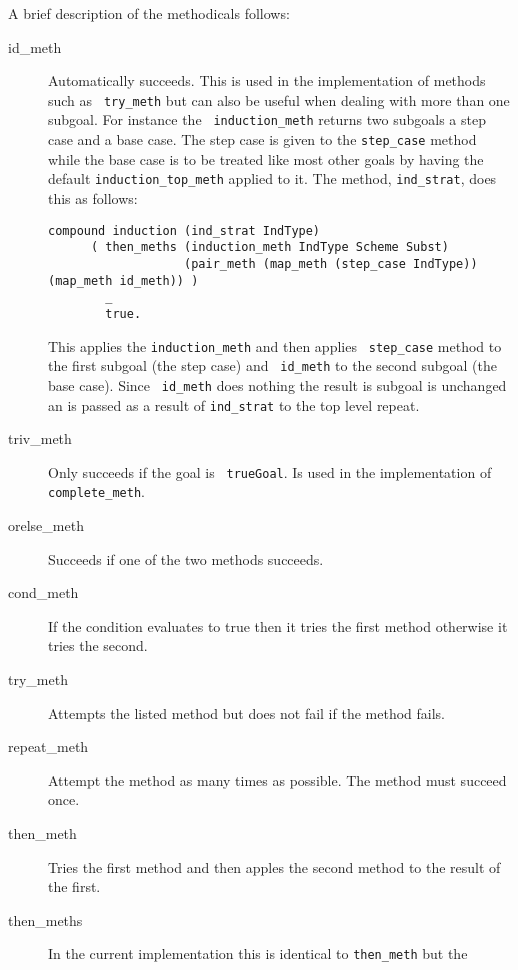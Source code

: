 A brief description of the methodicals follows:
\begin{description}
\item[id\_meth] Automatically succeeds.  This is used
  in the implementation of methods such as {\tt
    try\_meth} but can also be useful when dealing
  with more than one subgoal.  For instance the {\tt
    induction\_meth} returns two subgoals a
  step case and a base case.  The
  step case is given to the {\tt step\_case} method
  while the base case is to be treated like most other goals by having 
  the default {\tt induction\_top\_meth}
  applied to it.  The method, {\tt ind\_strat}, does 
  this as follows:
\begin{verbatim}
compound induction (ind_strat IndType)
      ( then_meths (induction_meth IndType Scheme Subst)
                   (pair_meth (map_meth (step_case IndType)) (map_meth id_meth)) )
        _
        true.
\end{verbatim}
This applies the {\tt induction\_meth} and then applies {\tt
  step\_case} method to the first subgoal (the step case) and {\tt
  id\_meth} to the second subgoal (the base case).  Since {\tt
  id\_meth} does nothing the result is subgoal is unchanged an is
passed as a result of {\tt ind\_strat} to the top level repeat.
\item[triv\_meth] Only succeeds if the goal is {\tt
    trueGoal}.  Is used in the implementation of {\tt
    complete\_meth}.
\item[orelse\_meth] Succeeds if one of the two
  methods succeeds.
\item[cond\_meth] If the condition evaluates to true 
  then it tries the first method otherwise it tries the second.
\item[try\_meth] Attempts the listed method but does
  not fail if the method fails.
\item[repeat\_meth] Attempt the method as many
  times as possible.  The method must succeed once.
\item[then\_meth] Tries the first method and then
  apples the second method to the result of the first.
\item[then\_meths] In the current implementation
  this is identical to {\tt then\_meth} but the

\end{description}
